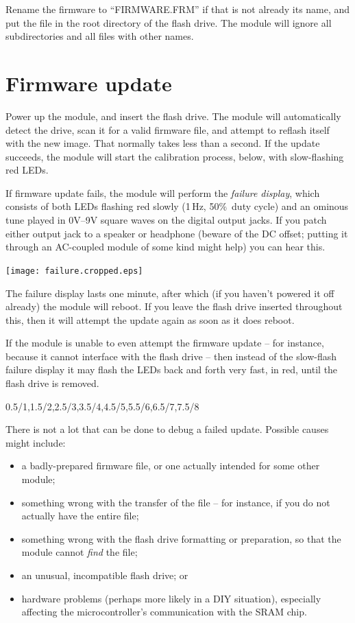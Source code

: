 Rename the firmware to ``FIRMWARE.FRM'' if that is not already its name, and
put the file in the root directory of the flash drive.  The module will
ignore all subdirectories and all files with other names.

\section{Firmware update}

Power up the module, and insert the flash drive.  The module will
automatically detect the drive, scan it for a valid firmware file, and
attempt to reflash itself with the new image.  That normally takes less than
a second.  If the update succeeds, the module will start the calibration
process, below, with slow-flashing red LEDs.

If firmware update fails, the module will perform the \emph{failure
display}, which consists of both LEDs flashing red slowly (1\,Hz, 50\%\ duty
cycle) and an ominous tune played in 0V--9V square waves on the digital output
jacks.  If you patch either output jack to a speaker or headphone (beware of
the DC offset; putting it through an AC-coupled module of some kind might
help) you can hear this.

\qquad\texttt{[image: failure.cropped.eps]}


The failure display lasts one minute, after which (if you haven't powered it
off already) the module will reboot.  If you leave the flash drive inserted
throughout this, then it will attempt the update again as soon as it does
reboot.

If the module is unable to even attempt the firmware update -- for instance,
because it cannot interface with the flash drive -- then instead of the
slow-flash failure display it may flash the LEDs back and forth very fast, in
red, until the flash drive is removed.

%
{}{0.5/1,1.5/2,2.5/3,3.5/4,4.5/5,5.5/6,6.5/7,7.5/8}

There is not a lot that can be done to debug a failed update.  Possible
causes might include:
\begin{itemize}
  \item a badly-prepared firmware file, or one actually intended for some
    other module;
  \item something wrong with the transfer of the file -- for instance, if
    you do not actually have the entire file;
  \item something wrong with the flash drive formatting or preparation, so
    that the module cannot \emph{find} the file;
  \item an unusual, incompatible flash drive; or
  \item hardware problems (perhaps more likely in a DIY situation),
    especially affecting the microcontroller's communication with the
    SRAM chip.
\end{itemize}

